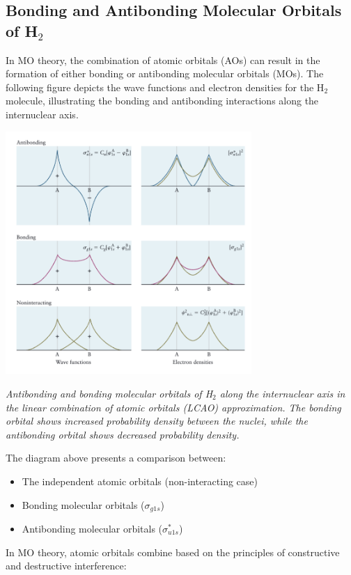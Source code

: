\documentclass{report}
\begin{document}
\subsection{Bonding and Antibonding Molecular Orbitals of H$_2$}

In MO theory, the combination of atomic orbitals (AOs) can result in the formation of either bonding or antibonding molecular orbitals (MOs). The following figure depicts the wave functions and electron densities for the H$_2$ molecule, illustrating the bonding and antibonding interactions along the internuclear axis.

\begin{center}
	\includegraphics[width=0.7\textwidth]{3.png}
\end{center}
\textit{Antibonding and bonding molecular orbitals of H$_2$ along the internuclear axis in the linear combination of atomic orbitals (LCAO) approximation. The bonding orbital shows increased probability density between the nuclei, while the antibonding orbital shows decreased probability density.}

The diagram above presents a comparison between:

\begin{itemize}
	\item The independent atomic orbitals (non-interacting case)
	\item Bonding molecular orbitals ($\sigma_{g1s}$)
	\item Antibonding molecular orbitals ($\sigma^*_{u1s}$)
\end{itemize}
In MO theory, atomic orbitals combine based on the principles of constructive and destructive interference:
\end{document}
